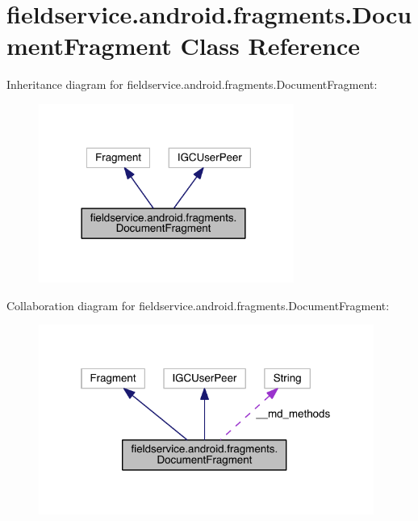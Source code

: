 \hypertarget{classfieldservice_1_1android_1_1fragments_1_1_document_fragment}{\section{fieldservice.\+android.\+fragments.\+Document\+Fragment Class Reference}
\label{classfieldservice_1_1android_1_1fragments_1_1_document_fragment}
}


Inheritance diagram for fieldservice.\+android.\+fragments.\+Document\+Fragment\+:
\nopagebreak
\begin{figure}[H]
\begin{center}
\leavevmode
\includegraphics[width=237pt]{classfieldservice_1_1android_1_1fragments_1_1_document_fragment__inherit__graph}
\end{center}
\end{figure}


Collaboration diagram for fieldservice.\+android.\+fragments.\+Document\+Fragment\+:
\nopagebreak
\begin{figure}[H]
\begin{center}
\leavevmode
\includegraphics[width=311pt]{classfieldservice_1_1android_1_1fragments_1_1_document_fragment__coll__graph}
\end{center}
\end{figure}
